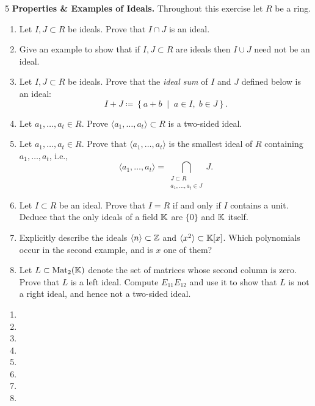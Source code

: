 \documentclass[Notebook.tex]{subfiles}
\begin{document}
\begin{problem}{5}\label{r:ideals}
	\textbf{Properties \& Examples of Ideals.} Throughout this exercise let $R$ be a ring.
	\begin{enumerate}[label=(\alph*),ref=\theenumi\alph*]
		\item Let $I, J \subset R$ be ideals. Prove that $I\cap J$ is an ideal.
		\item Give an example to show that if $I,J \subset R$ are ideals then $I\cup J$ need not be an ideal.
		\item Let $I, J \subset R$ be ideals. Prove that the \emph{ideal sum} of $I$ and $J$ defined below is an ideal:
		\[
		I+J \coloneqq \left\{ a+b \;\; \big| \;\; a\in I, \; b\in J\right\}.
		\]
		\item Let $a_1,\ldots,a_t \in R$. Prove $\langle a_1,\ldots,a_t\rangle \subset R$ is a two-sided ideal.
		\item Let $a_1,\ldots,a_t \in R$. Prove that $\langle a_1,\ldots,a_t\rangle$ is the smallest ideal of $R$ containing $a_1,\ldots,a_t$, i.e.,
		\[
		\langle a_1,\ldots,a_t\rangle = \bigcap_{\substack{J \subset R \\ a_1,\ldots,a_t \in J}} J.
		\]
		\item Let $I \subset R$ be an ideal. Prove that $I=R$ if and only if $I$ contains a unit. Deduce that the only ideals of a field $\mathbb K$ are $\{0\}$ and $\mathbb K$ itself.
		\item Explicitly describe the ideals $\langle n\rangle \subset \mathbb Z$ and $\langle x^2\rangle\subset \mathbb K[x]$. Which polynomials occur in the second example, and is $x$ one of them?
		\item Let $L\subset \operatorname{Mat}_2(\mathbb K)$ denote the set of matrices whose second column is zero. Prove that $L$ is a left ideal. Compute $E_{11}E_{12}$ and use it to show that $L$ is not a right ideal, and hence not a two-sided ideal.
	\end{enumerate}
\end{problem}

\begin{solution}
	\bbni
	\begin{enumerate}[label=(\alph*),ref=\theenumi\alph*]
		\item
		\item
		\item
		\item
		\item
		\item
		\item
		\item
	\end{enumerate}
\end{solution}
\end{document}
